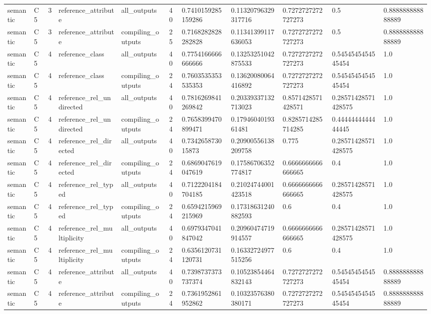 \begin{tabular}{lllllllllll}
semantic & C5 & 3 & reference\_attribute & all\_outputs & 40 & 0.7410159285159286 & 0.11320796329317716 & 0.7272727272727273 & 0.5 & 0.888888888888889 \\
semantic & C5 & 3 & reference\_attribute & compiling\_outputs & 25 & 0.7168282828282828 & 0.11341399117636053 & 0.7272727272727273 & 0.5 & 0.888888888888889 \\
semantic & C5 & 4 & reference\_class & all\_outputs & 40 & 0.7754166666666666 & 0.13253251042875533 & 0.7272727272727273 & 0.5454545454545454 & 1.0 \\
semantic & C5 & 4 & reference\_class & compiling\_outputs & 24 & 0.7603535353535353 & 0.13620080064416892 & 0.7272727272727273 & 0.5454545454545454 & 1.0 \\
semantic & C5 & 4 & reference\_rel\_undirected & all\_outputs & 40 & 0.7816269841269842 & 0.20339337132713023 & 0.8571428571428571 & 0.28571428571428575 & 1.0 \\
semantic & C5 & 4 & reference\_rel\_undirected & compiling\_outputs & 24 & 0.7658399470899471 & 0.1794604019361481 & 0.8285714285714285 & 0.4444444444444445 & 1.0 \\
semantic & C5 & 4 & reference\_rel\_directed & all\_outputs & 40 & 0.734265873015873 & 0.20900556138209758 & 0.775 & 0.28571428571428575 & 1.0 \\
semantic & C5 & 4 & reference\_rel\_directed & compiling\_outputs & 24 & 0.6869047619047619 & 0.17586706352774817 & 0.6666666666666665 & 0.4 & 1.0 \\
semantic & C5 & 4 & reference\_rel\_typed & all\_outputs & 40 & 0.7122204184704185 & 0.21024744001423518 & 0.6666666666666665 & 0.28571428571428575 & 1.0 \\
semantic & C5 & 4 & reference\_rel\_typed & compiling\_outputs & 24 & 0.6594215969215969 & 0.17318631240882593 & 0.6 & 0.4 & 1.0 \\
semantic & C5 & 4 & reference\_rel\_multiplicity & all\_outputs & 40 & 0.6979347041847042 & 0.20960474719914557 & 0.6666666666666665 & 0.28571428571428575 & 1.0 \\
semantic & C5 & 4 & reference\_rel\_multiplicity & compiling\_outputs & 24 & 0.6356120731120731 & 0.16332724977515256 & 0.6 & 0.4 & 1.0 \\
semantic & C5 & 4 & reference\_attribute & all\_outputs & 40 & 0.7398737373737374 & 0.10523854464832143 & 0.7272727272727273 & 0.5454545454545454 & 0.888888888888889 \\
semantic & C5 & 4 & reference\_attribute & compiling\_outputs & 24 & 0.7361952861952862 & 0.10323576380380171 & 0.7272727272727273 & 0.5454545454545454 & 0.888888888888889 \\

\end{tabular}
